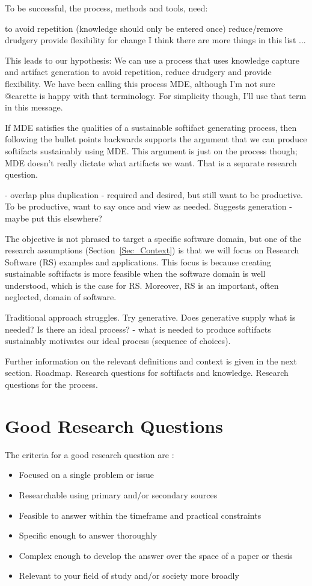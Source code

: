 \documentclass[12pt]{article}
\begin{document}
To be successful, the process, methods and tools, need:

to avoid repetition (knowledge should only be entered once)
reduce/remove drudgery
provide flexibility for change
I think there are more things in this list ...

This leads to our hypothesis: We can use a process that uses knowledge capture
and artifact generation to avoid repetition, reduce drudgery and provide
flexibility.  We have been calling this process MDE, although I'm not sure
@carette is happy with that terminology.  For simplicity though, I'll use that
term in this message.

If MDE satisfies the qualities of a sustainable softifact generating process,
then following the bullet points backwards supports the argument that we can
produce softifacts sustainably using MDE.  This argument is just on the process
though; MDE doesn't really dictate what artifacts we want.  That is a separate
research question.

- overlap
plus duplication - required and desired, but still want to be productive.  To be
productive, want to say once and view as needed.  Suggests generation - maybe
put this elsewhere?

The objective is not phrased to target a specific software domain, but one of
the research assumptions (Section~\ref{Sec_Context}) is that we will focus on
Research Software (RS) examples and applications.  This focus is because
creating sustainable softifacts is more feasible when the software domain is
well understood, which is the case for RS.  Moreover, RS is an important,
often neglected, domain of software.

Traditional approach struggles.  Try generative.  Does generative supply what is
needed?  Is there an ideal process?  - what is needed to produce softifacts
sustainably motivates our ideal process (sequence of choices).

Further information on the relevant definitions and context is given in the next
section.  Roadmap.  Research questions for softifacts and knowledge.  Research
questions for the process.

\section{Good Research Questions}

The criteria for a good research question are :

\begin{itemize}
\item Focused on a single problem or issue
\item Researchable using primary and/or secondary sources
\item Feasible to answer within the timeframe and practical constraints
\item Specific enough to answer thoroughly
\item Complex enough to develop the answer over the space of a paper or thesis
\item Relevant to your field of study and/or society more broadly
\end{itemize}
\end{document}
